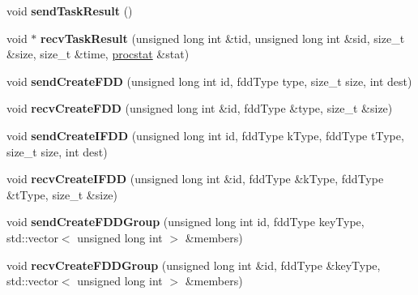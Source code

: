 \begin{DoxyCompactItemize}
\item 
\hypertarget{classfaster_1_1fastComm_afa35823e5ba267525e6cccbf0732c4b5}{}void {\bfseries send\+Task\+Result} ()\label{classfaster_1_1fastComm_afa35823e5ba267525e6cccbf0732c4b5}

\item 
\hypertarget{classfaster_1_1fastComm_a41016be2a3623487039d4c40b9762a7c}{}void $\ast$ {\bfseries recv\+Task\+Result} (unsigned long int \&tid, unsigned long int \&sid, size\+\_\+t \&size, size\+\_\+t \&time, \hyperlink{classfaster_1_1procstat}{procstat} \&stat)\label{classfaster_1_1fastComm_a41016be2a3623487039d4c40b9762a7c}

\item 
\hypertarget{classfaster_1_1fastComm_aedf068e090c89b62cf23bb060ed98bd8}{}void {\bfseries send\+Create\+F\+D\+D} (unsigned long int id, fdd\+Type type, size\+\_\+t size, int dest)\label{classfaster_1_1fastComm_aedf068e090c89b62cf23bb060ed98bd8}

\item 
\hypertarget{classfaster_1_1fastComm_a6335e73103253b835208bbb3b15a318a}{}void {\bfseries recv\+Create\+F\+D\+D} (unsigned long int \&id, fdd\+Type \&type, size\+\_\+t \&size)\label{classfaster_1_1fastComm_a6335e73103253b835208bbb3b15a318a}

\item 
\hypertarget{classfaster_1_1fastComm_a1b714530bd2e7c2e0c6a65480bdf5dcf}{}void {\bfseries send\+Create\+I\+F\+D\+D} (unsigned long int id, fdd\+Type k\+Type, fdd\+Type t\+Type, size\+\_\+t size, int dest)\label{classfaster_1_1fastComm_a1b714530bd2e7c2e0c6a65480bdf5dcf}

\item 
\hypertarget{classfaster_1_1fastComm_a81974b476357e1d465268d58b14de068}{}void {\bfseries recv\+Create\+I\+F\+D\+D} (unsigned long int \&id, fdd\+Type \&k\+Type, fdd\+Type \&t\+Type, size\+\_\+t \&size)\label{classfaster_1_1fastComm_a81974b476357e1d465268d58b14de068}

\item 
\hypertarget{classfaster_1_1fastComm_a66d4d60b7222f81167428594a26d1138}{}void {\bfseries send\+Create\+F\+D\+D\+Group} (unsigned long int id, fdd\+Type key\+Type, std\+::vector$<$ unsigned long int $>$ \&members)\label{classfaster_1_1fastComm_a66d4d60b7222f81167428594a26d1138}

\item 
\hypertarget{classfaster_1_1fastComm_a7c04292c7b224a00fbe414e6d22d4bf4}{}void {\bfseries recv\+Create\+F\+D\+D\+Group} (unsigned long int \&id, fdd\+Type \&key\+Type, std\+::vector$<$ unsigned long int $>$ \&members)\label{classfaster_1_1fastComm_a7c04292c7b224a00fbe414e6d22d4bf4}


\end{DoxyCompactItemize}
